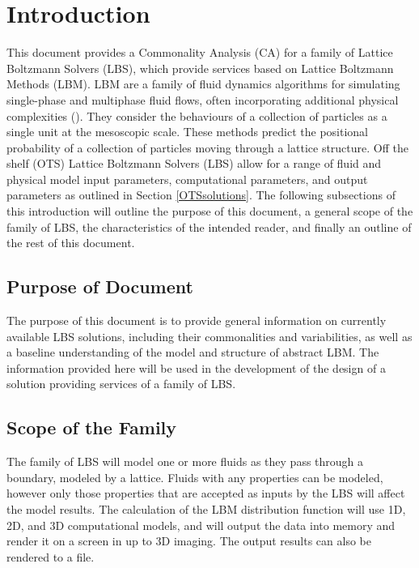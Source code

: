 \documentclass[12pt]{article}
\begin{document}
\newpage

\tableofcontents

\newpage
\section{Introduction}

This document provides a Commonality Analysis (CA) for a family of Lattice Boltzmann Solvers (LBS), which provide services based on Lattice Boltzmann Methods (LBM).
LBM are a family of fluid dynamics algorithms for simulating single-phase and multiphase fluid flows, often incorporating additional physical complexities (\citet{chen1998lattice}). They consider the behaviours of a collection of particles as a single unit at the mesoscopic scale. These methods predict the positional probability of a collection of particles moving through a lattice structure. Off the shelf (OTS) Lattice Boltzmann Solvers (LBS) allow for a range of fluid and physical model input parameters, computational parameters, and output parameters as outlined in Section \ref{OTSsolutions}.
The following subsections of this introduction will outline the purpose of this document, a general scope of the family of LBS, the characteristics of the intended reader, and finally an outline of the rest of this document.

\subsection{Purpose of Document}

The purpose of this document is to provide general information on currently available LBS solutions, including their commonalities and variabilities, as well as a baseline understanding of the model and structure of abstract LBM. The information provided here will be used in the development of the design of a solution providing services of a family of LBS.

\subsection{Scope of the Family}
\label{scopeoffamily} 

The family of LBS will model one or more fluids as they pass through a boundary, modeled by a lattice. Fluids with any properties can be modeled, however only those properties that are accepted as inputs by the LBS will affect the model results. The calculation of the LBM distribution function will use 1D, 2D, and 3D computational models, and will output the data into memory and render it on a screen in up to 3D imaging. The output results can also be rendered to a file.\\
\end{document}
